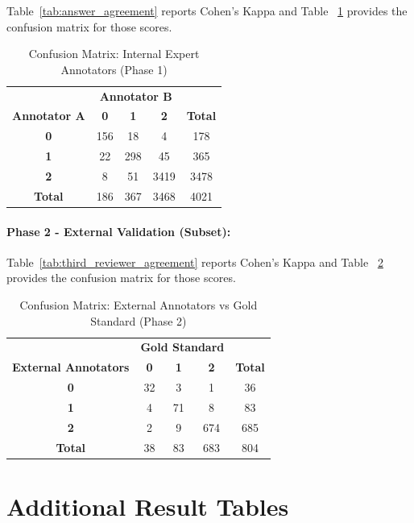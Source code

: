 \documentclass[11pt]{article}
\begin{document}
Table~\ref{tab:answer_agreement} reports Cohen's Kappa and Table ~\ref{tab:confusion_internal} provides the confusion matrix for those scores.

\begin{table}[htbp]
\centering
\small
\begin{tabular}{c|ccc|c}
\toprule
& \multicolumn{3}{c|}{\textbf{Annotator B}} & \\
\textbf{Annotator A} & \textbf{0} & \textbf{1} & \textbf{2} & \textbf{Total} \\
\midrule
\textbf{0} & 156 & 18 & 4 & 178 \\
\textbf{1} & 22 & 298 & 45 & 365 \\
\textbf{2} & 8 & 51 & 3419 & 3478 \\
\midrule
\textbf{Total} & 186 & 367 & 3468 & 4021 \\
\bottomrule
\end{tabular}
\caption{Confusion Matrix: Internal Expert Annotators (Phase 1)}
\label{tab:confusion_internal}
\end{table}

\paragraph{Phase 2 - External Validation (Subset):}
Table~\ref{tab:third_reviewer_agreement} reports Cohen's Kappa and Table ~\ref{tab:confusion_external} provides the confusion matrix for those scores.


\begin{table}[htbp]
\centering
\small
\begin{tabular}{c|ccc|c}
\toprule
& \multicolumn{3}{c|}{\textbf{Gold Standard}} & \\
\textbf{External Annotators} & \textbf{0} & \textbf{1} & \textbf{2} & \textbf{Total} \\
\midrule
\textbf{0} & 32 & 3 & 1 & 36 \\
\textbf{1} & 4 & 71 & 8 & 83 \\
\textbf{2} & 2 & 9 & 674 & 685 \\
\midrule
\textbf{Total} & 38 & 83 & 683 & 804 \\
\bottomrule
\end{tabular}
\caption{Confusion Matrix: External Annotators vs Gold Standard (Phase 2)}
\label{tab:confusion_external}
\end{table}



\section{Additional Result Tables}
\label{sec:additional_results}
\end{document}
